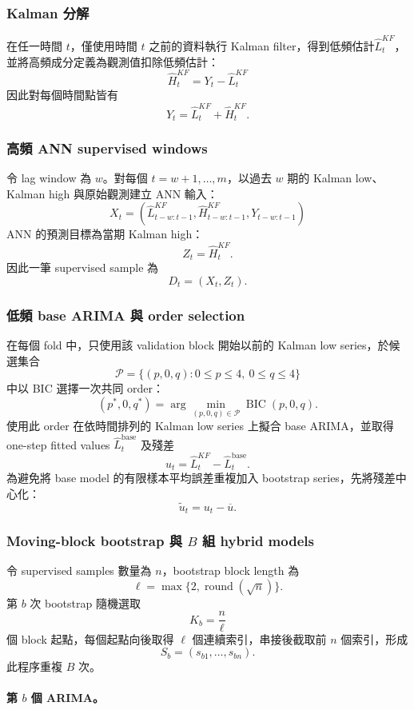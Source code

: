 {\subsubsection*{Kalman 分解}
在任一時間 $t$，僅使用時間 $t$ 之前的資料執行 Kalman filter，得到低頻估計$\widehat L_t^{KF}$，
並將高頻成分定義為觀測值扣除低頻估計：
\[\widehat H_t^{KF}=Y_t-\widehat L_t^{KF}\]
因此對每個時間點皆有
\[
    Y_t=\widehat L_t^{KF}+\widehat H_t^{KF}.
\]

\subsubsection*{高頻 ANN supervised windows}
令 lag window 為 $w$。對每個 $t=w+1,\ldots,m$，以過去 $w$ 期的 Kalman low、Kalman high 與原始觀測建立 ANN 輸入：
\[
    X_t=(
    \widehat L_{t-w:t-1}^{KF},
    \widehat H_{t-w:t-1}^{KF},
    Y_{t-w:t-1}
    )
\]
ANN 的預測目標為當期 Kalman high：
\[
    Z_t=\widehat H_t^{KF}.
\]
因此一筆 supervised sample 為
\[
    D_t=(X_t,Z_t).
\]

\subsubsection*{低頻 base ARIMA 與 order selection}

在每個 fold 中，只使用該 validation block 開始以前的 Kalman low series，於候選集合
\[
    \mathcal P=\{(p,0,q):0\leq p\leq4,\ 0\leq q\leq4\}
\]
中以 BIC 選擇一次共同 order：
\[
    (p^\ast,0,q^\ast)
    =\arg\min_{(p,0,q)\in\mathcal P}\operatorname{BIC}(p,0,q).
\]
使用此 order 在依時間排列的 Kalman low series 上擬合 base ARIMA，並取得 one-step fitted values $\widehat L_t^{\mathrm{base}}$ 及殘差
\[
    u_t=\widehat L_t^{KF}-\widehat L_t^{\mathrm{base}}.
\]
為避免將 base model 的有限樣本平均誤差重複加入 bootstrap series，先將殘差中心化：
\[
    \widetilde u_t=u_t-\overline u.
\]

\subsubsection*{Moving-block bootstrap 與 $B$ 組 hybrid models}

令 supervised samples 數量為 $n$，bootstrap block length 為
\[
    \ell=\max\{2,\operatorname{round}(\sqrt n)\}.
\]
第 $b$ 次 bootstrap 隨機選取
\[
    K_b=\frac{n}{\ell}
\]
個 block 起點，每個起點向後取得 $\ell$ 個連續索引，串接後截取前 $n$ 個索引，形成
\[
    S_b=(s_{b1},\ldots,s_{bn}).
\]
此程序重複 $B$ 次。

\paragraph{第 $b$ 個 ARIMA。}


}
